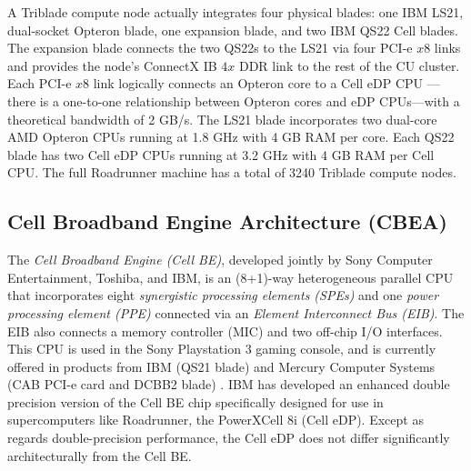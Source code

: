 \documentclass[journal,twoside]{IEEEtran}
\begin{document}
A Triblade compute node actually integrates four physical blades: one
IBM LS21, dual-socket Opteron blade, one expansion blade, and two IBM
QS22 Cell blades.  The expansion blade connects the two QS22s to the
LS21 via four PCI-e $x8$ links and provides the node's ConnectX IB
$4x$ DDR link to the rest of the CU cluster.  Each PCI-e $x8$ link
logically connects an Opteron core to a Cell eDP CPU ---there is a
one-to-one relationship between Opteron cores and eDP CPUs---with a
theoretical bandwidth of 2 GB/s.
The LS21 blade incorporates two dual-core AMD Opteron CPUs running at
1.8 GHz with 4 GB RAM per core.  Each QS22 blade has two Cell eDP CPUs
running at 3.2 GHz with 4 GB RAM per Cell CPU.  The full Roadrunner
machine has a total of 3240 Triblade compute nodes.

\subsection{Cell Broadband Engine Architecture (CBEA)}


The \emph{Cell Broadband Engine (Cell BE)}, developed jointly by Sony
Computer Entertainment, Toshiba, and IBM, is an (8+1)-way
heterogeneous parallel CPU that incorporates eight
\emph{synergistic processing elements (SPEs)} and one
\emph{power processing element (PPE)} connected via an
\emph{Element Interconnect Bus (EIB)}.  The EIB also connects
a memory controller (MIC) and two off-chip I/O interfaces.  This CPU
is used in the Sony Playstation 3 gaming console, and is currently
offered in products from IBM (QS21 blade) and Mercury Computer Systems
(CAB PCI-e card and DCBB2 blade) \cite{mercury}.  IBM has developed an
enhanced double precision version of the Cell BE chip specifically
designed for use in supercomputers like Roadrunner, the PowerXCell 8i
(Cell eDP).  Except as regards double-precision performance, the Cell
eDP does not differ significantly architecturally from the Cell BE.
\end{document}
